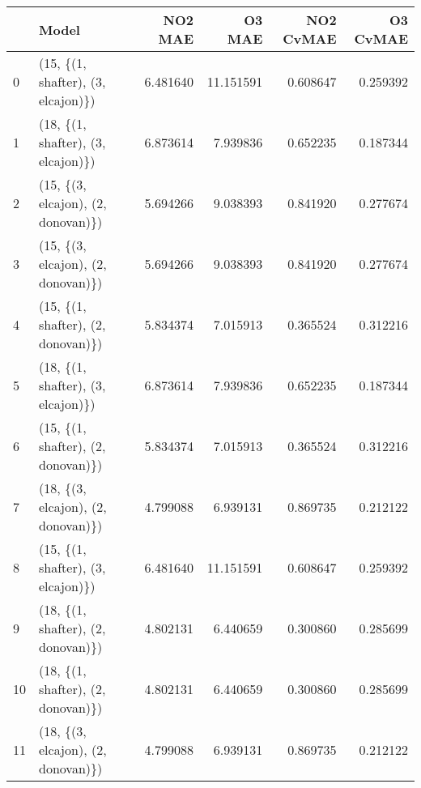 \begin{tabular}{llrrrr}
\toprule
{} &                               Model &   NO2 MAE &     O3 MAE &  NO2 CvMAE &  O3 CvMAE \\
\midrule
0  &  (15, \{(1, shafter), (3, elcajon)\}) &  6.481640 &  11.151591 &   0.608647 &  0.259392 \\
1  &  (18, \{(1, shafter), (3, elcajon)\}) &  6.873614 &   7.939836 &   0.652235 &  0.187344 \\
2  &  (15, \{(3, elcajon), (2, donovan)\}) &  5.694266 &   9.038393 &   0.841920 &  0.277674 \\
3  &  (15, \{(3, elcajon), (2, donovan)\}) &  5.694266 &   9.038393 &   0.841920 &  0.277674 \\
4  &  (15, \{(1, shafter), (2, donovan)\}) &  5.834374 &   7.015913 &   0.365524 &  0.312216 \\
5  &  (18, \{(1, shafter), (3, elcajon)\}) &  6.873614 &   7.939836 &   0.652235 &  0.187344 \\
6  &  (15, \{(1, shafter), (2, donovan)\}) &  5.834374 &   7.015913 &   0.365524 &  0.312216 \\
7  &  (18, \{(3, elcajon), (2, donovan)\}) &  4.799088 &   6.939131 &   0.869735 &  0.212122 \\
8  &  (15, \{(1, shafter), (3, elcajon)\}) &  6.481640 &  11.151591 &   0.608647 &  0.259392 \\
9  &  (18, \{(1, shafter), (2, donovan)\}) &  4.802131 &   6.440659 &   0.300860 &  0.285699 \\
10 &  (18, \{(1, shafter), (2, donovan)\}) &  4.802131 &   6.440659 &   0.300860 &  0.285699 \\
11 &  (18, \{(3, elcajon), (2, donovan)\}) &  4.799088 &   6.939131 &   0.869735 &  0.212122 \\
\bottomrule
\end{tabular}
